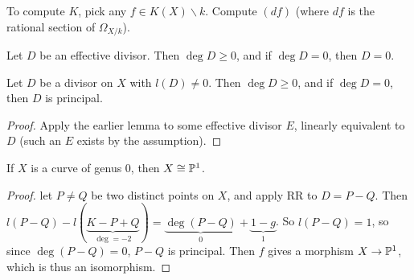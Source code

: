  To compute $K$, pick any $f\in K(X)\smallsetminus k$.  Compute
 $(df)$ (where $df$ is the rational section of $\Omega_{X/k}$).

 \begin{lemma}
 Let $D$ be an effective divisor.  Then $\deg D\ge 0$, and if
 $\deg D=0$, then $D=0$.
 \end{lemma}

 \begin{lemma}
 Let $D$ be a divisor on $X$ with $l(D)\not=0$.  Then $\deg D\ge
 0$, and if $\deg D=0$, then $D$ is principal.
 \end{lemma}
 \begin{proof}
 Apply the earlier lemma to some effective divisor $E$, linearly
 equivalent to $D$ (such an $E$ exists by the assumption).
 \end{proof}

 \begin{proposition}
 If $X$ is a curve of genus 0, then $X\cong \P^1$.
 \end{proposition}
 \begin{proof}
 let $P\not= Q$ be two distinct points on $X$, and apply RR to
 $D=P-Q$.  Then
 $l(P-Q)-l(\underbrace{K-P+Q}_{\deg =
 -2})=\underbrace{\deg(P-Q)}_0+\underbrace{1-g}_1$.  So
 $l(P-Q)=1$, so since $\deg(P-Q)=0$, $P-Q$ is principal.  Then $f$
 gives a morphism $X\to \P^1$, which is thus an isomorphism.
 \end{proof}
